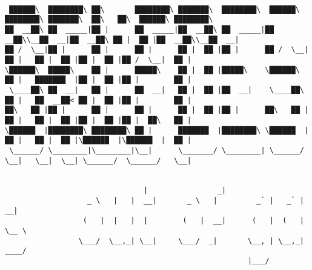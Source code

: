 \documentclass[varwidth=\maxdimen,margin=0.5cm,multi={verbatim}]{standalone}
\begin{document}
\begin{verbatim}

 ██████\  ████████\ ██\       ████████\ ███████\  ████████\  ██████\ ████████\ ███████\  ██\   ██\  ██████\ ████████\
██  __██\ ██  _____|██ |      ██  _____|██  __██\ ██  _____|██  __██\\__██  __|██  __██\ ██ |  ██ |██  __██\\__██  __|
██ /  \__|██ |      ██ |      ██ |      ██ |  ██ |██ |      ██ /  \__|  ██ |   ██ |  ██ |██ |  ██ |██ /  \__|  ██ |
\██████\  █████\    ██ |      █████\    ██ |  ██ |█████\    \██████\    ██ |   ███████  |██ |  ██ |██ |        ██ |
 \____██\ ██  __|   ██ |      ██  __|   ██ |  ██ |██  __|    \____██\   ██ |   ██  __██< ██ |  ██ |██ |        ██ |
██\   ██ |██ |      ██ |      ██ |      ██ |  ██ |██ |      ██\   ██ |  ██ |   ██ |  ██ |██ |  ██ |██ |  ██\   ██ |
\██████  |████████\ ████████\ ██ |      ███████  |████████\ \██████  |  ██ |   ██ |  ██ |\██████  |\██████  |  ██ |
 \______/ \________|\________|\__|      \_______/ \________| \______/   \__|   \__|  \__| \______/  \______/   \__|


                                |                _|
                   _ \   |   |  __|       _ \   |         _` |   _` |   __|
                  (   |  |   |  |        (   |  __|      (   |  (   | \__ \
                 \___/  \__,_| \__|     \___/  _|       \__, | \__,_| ____/
                                                        |___/


\end{verbatim}
\end{document}
